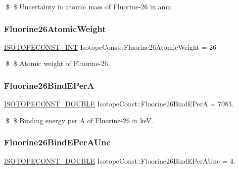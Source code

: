 \$ \$ Uncertainty in atomic mass of Fluorine-\/26 in amu. \mbox{\label{group___isotope_const-_fluorine-_f26_ga0c00b84f7b1bac82e59a4fb493996b44}} 
\subsubsection{\texorpdfstring{Fluorine26\+Atomic\+Weight}{Fluorine26AtomicWeight}}
{\footnotesize\ttfamily \mbox{\hyperlink{group___isotope_const-_macros_ga5f18360b3e99483a35c32d789e62621c}{I\+S\+O\+T\+O\+P\+E\+C\+O\+N\+S\+T\+\_\+\+I\+NT}} Isotope\+Const\+::\+Fluorine26\+Atomic\+Weight = 26}

\$ \$ Atomic weight of Fluorine-\/26. \mbox{\label{group___isotope_const-_fluorine-_f26_ga09d5dcb93a5ba236431593d01a10a48d}} 
\subsubsection{\texorpdfstring{Fluorine26\+Bind\+E\+PerA}{Fluorine26BindEPerA}}
{\footnotesize\ttfamily \mbox{\hyperlink{group___isotope_const-_macros_ga8f45a7272ce02c0b4c65c44636ed719a}{I\+S\+O\+T\+O\+P\+E\+C\+O\+N\+S\+T\+\_\+\+D\+O\+U\+B\+LE}} Isotope\+Const\+::\+Fluorine26\+Bind\+E\+PerA = 7083.}

\$ \$ Binding energy per A of Fluorine-\/26 in keV. \mbox{\label{group___isotope_const-_fluorine-_f26_gad15a5a8d45e53af4a9db34ca4c187548}} 
\subsubsection{\texorpdfstring{Fluorine26\+Bind\+E\+Per\+A\+Unc}{Fluorine26BindEPerAUnc}}
{\footnotesize\ttfamily \mbox{\hyperlink{group___isotope_const-_macros_ga8f45a7272ce02c0b4c65c44636ed719a}{I\+S\+O\+T\+O\+P\+E\+C\+O\+N\+S\+T\+\_\+\+D\+O\+U\+B\+LE}} Isotope\+Const\+::\+Fluorine26\+Bind\+E\+Per\+A\+Unc = 4.}

